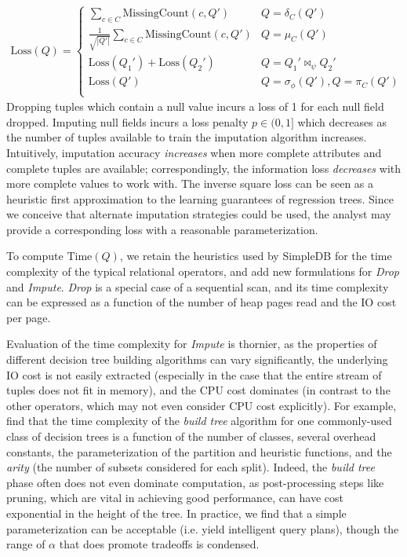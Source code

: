 \begin{align*}
  \text{Loss}(Q) = \begin{cases}
    \sum_{c \in C} \text{MissingCount}(c, Q') & Q = \delta_C(Q') \\
    \frac{1}{\sqrt{|Q'|}} \sum_{c \in C} \text{MissingCount}(c, Q') & Q = \mu_C(Q') \\
    \text{Loss}(Q_1') + \text{Loss}(Q_2') & Q = Q_1' \bowtie_\psi Q_2' \\
    \text{Loss}(Q') & Q = \sigma_\phi(Q'), Q = \pi_C(Q') \\
  \end{cases}
\end{align*}
Dropping tuples which contain a null value incurs a loss of 1 for each null field dropped.
Imputing null fields incurs a loss penalty $p \in (0, 1]$ which decreases as the number of
tuples available to train the imputation algorithm increases.  Intuitively, imputation
accuracy \textit{increases} when more complete attributes and complete tuples are available;
correspondingly, the information loss \textit{decreases} with more complete values to work
with. The inverse square loss can be seen as a heuristic first approximation to the learning guarantees of
regression trees. Since we conceive that
alternate imputation strategies could be used, the analyst may provide a corresponding
loss with a reasonable parameterization.

To compute $\text{Time}(Q)$, we retain the heuristics used by SimpleDB for the time
complexity of the typical relational operators, and add new formulations for \textit{Drop}
and \textit{Impute}. \textit{Drop} is a special case of a sequential scan, and its time
complexity can be expressed as a function of the number of heap pages read and the IO cost
per page.

Evaluation of the time complexity for \textit{Impute} is thornier, as the properties of
different decision tree building algorithms can vary significantly, the underlying IO cost
is not easily extracted (especially in the case that the entire stream of tuples does not
fit in memory), and the CPU cost dominates (in contrast to the other operators, which may
not even consider CPU cost explicitly). For example, \cite{martin1995time} find that the
time complexity of the \textit{build tree} algorithm for one commonly-used class of
decision trees is a function of the number of classes, several overhead constants, the
parameterization of the partition and heuristic functions, and the \textit{arity} (the
number of subsets considered for each split). Indeed, the \textit{build tree} phase often
does not even dominate computation, as post-processing steps like pruning, which are vital
in achieving good performance, can have cost exponential in the height of the tree. In
practice, we find that a simple parameterization can be acceptable (i.e. yield intelligent query
plans), though the range of $\alpha$ that does promote tradeoffs is condensed.


